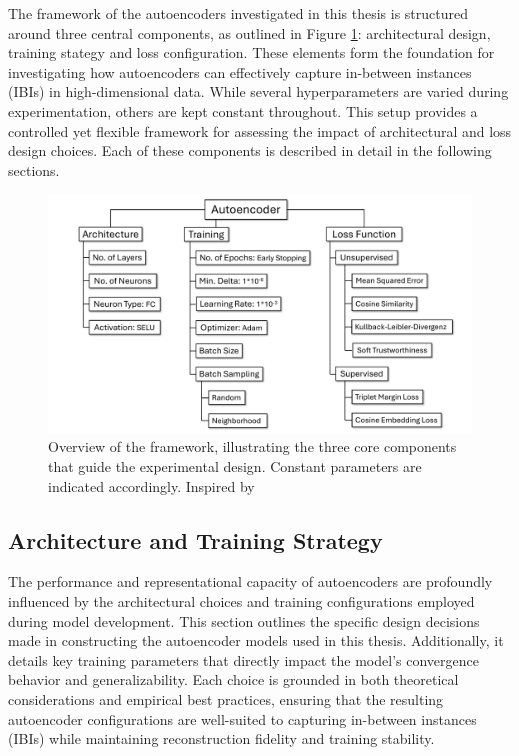 The framework of the autoencoders investigated in this thesis is structured around three central components, as outlined in Figure \ref{fig:roadmap}: architectural design, training stategy and loss configuration. These elements form the foundation for investigating how autoencoders can effectively capture in-between instances (IBIs) in high-dimensional data. While several hyperparameters are varied during experimentation, others are kept constant throughout. This setup provides a controlled yet flexible framework for assessing the impact of architectural and loss design choices. Each of these components is described in detail in the following sections.
\begin{figure}[ht]
    \centering
    \includegraphics[width=\linewidth]{images/Roadmap.pdf}
    \caption{Overview of the framework, illustrating the three core components that guide the experimental design. Constant parameters are indicated accordingly. Inspired by \cite{Charte18}}
    \label{fig:roadmap}
\end{figure}

\subsection{Architecture and Training Strategy}

The performance and representational capacity of autoencoders are profoundly influenced by the architectural choices and training configurations employed during model development. This section outlines the specific design decisions made in constructing the autoencoder models used in this thesis. Additionally, it details key training parameters that directly impact the model’s convergence behavior and generalizability. Each choice is grounded in both theoretical considerations and empirical best practices, ensuring that the resulting autoencoder configurations are well-suited to capturing in-between instances (IBIs) while maintaining reconstruction fidelity and training stability.

